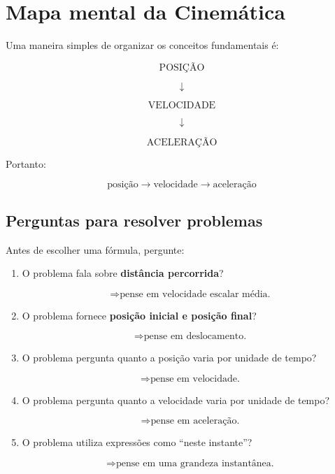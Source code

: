 \documentclass[a4paper,12pt]{article}
\begin{document}
\section{Mapa mental da Cinemática}

\begin{ideia}

Uma maneira simples de organizar os conceitos fundamentais é:

\[
\boxed{
\text{POSIÇÃO}
}
\]

\[
\downarrow
\]

\[
\boxed{
\text{VELOCIDADE}
}
\]

\[
\downarrow
\]

\[
\boxed{
\text{ACELERAÇÃO}
}
\]

Portanto:

\[
\boxed{
\text{posição}
\longrightarrow
\text{velocidade}
\longrightarrow
\text{aceleração}
}
\]

\end{ideia}


\subsection*{Perguntas para resolver problemas}

Antes de escolher uma fórmula, pergunte:

\begin{enumerate}

\item O problema fala sobre \textbf{distância percorrida}?

\[
\Rightarrow
\text{pense em velocidade escalar média.}
\]

\item O problema fornece \textbf{posição inicial e posição final}?

\[
\Rightarrow
\text{pense em deslocamento.}
\]

\item O problema pergunta quanto a posição varia por unidade de tempo?

\[
\Rightarrow
\text{pense em velocidade.}
\]

\item O problema pergunta quanto a velocidade varia por unidade de tempo?

\[
\Rightarrow
\text{pense em aceleração.}
\]

\item O problema utiliza expressões como
``neste instante''?

\[
\Rightarrow
\text{pense em uma grandeza instantânea.}
\]

\end{enumerate}
\end{document}
